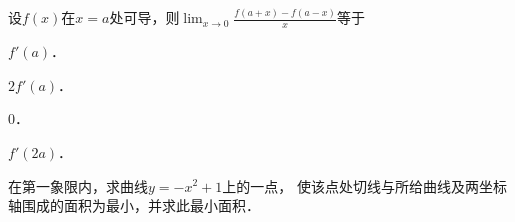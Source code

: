\documentclass[plain,noanswer,medmath]{../../template/jnuexam}
\begin{document}
\begin{problem}
设$f(x)$在$x=a$处可导，则$\lim_{x \to 0} \frac{f(a+x) - f(a-x)}{x}$等于\pickout{}
\begin{abcd}
\item $f'(a)$．
\item $2f'(a)$．
\item $0$．
\item $f'(2a)$．
\end{abcd}
\end{problem}





\begin{problem}
在第一象限内，求曲线$y = -x^2 + 1$上的一点，
使该点处切线与所给曲线及两坐标轴围成的面积为最小，并求此最小面积．
\end{problem}
\end{document}
